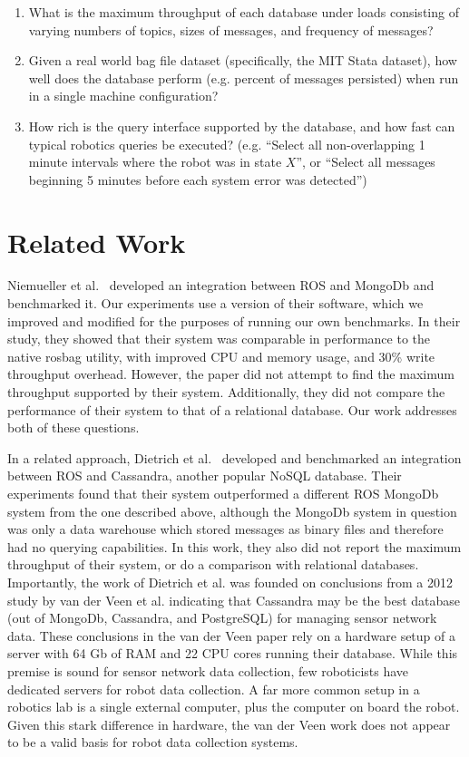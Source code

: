 \documentclass[nocopyrightspace]{acm_proc_article-sp}
\begin{document}
\begin{enumerate}
    \item What is the maximum throughput of each database under loads consisting of varying numbers of topics, sizes of messages, and frequency of messages? 
    \item Given a real world bag file dataset (specifically, the MIT Stata dataset), how well does the database perform (e.g. percent of messages persisted) when run in a single machine configuration?
    \item How rich is the query interface supported by the database, and how fast can typical robotics queries be executed? (e.g. ``Select all non-overlapping 1 minute intervals where the robot was in state $X$'', or ``Select all messages beginning 5 minutes before each system error was detected'')
\end{enumerate}

\section{Related Work}
Niemueller et al.~\cite{niemueller2012generic} developed an integration between ROS and MongoDb and benchmarked it. Our experiments use a version of their software, which we improved and modified for the purposes of running our own benchmarks. In their study, they showed that their system was comparable in performance to the native rosbag utility, with improved CPU and memory usage, and 30\% write throughput overhead. However, the paper did not attempt to find the maximum throughput supported by their system. Additionally, they did not compare the performance of their system to that of a relational database. Our work addresses both of these questions.

In a related approach, Dietrich et al.~\cite{dietrich2014ros} developed and benchmarked an integration between ROS and Cassandra, another popular NoSQL database. Their experiments found that their system outperformed a different ROS MongoDb system from the one described above, although the MongoDb system in question was only a data warehouse which stored messages as binary files and therefore had no querying capabilities. In this work, they also did not report the maximum throughput of their system, or do a comparison with relational databases. Importantly, the work of Dietrich et al. was founded on conclusions from a 2012 study by van der Veen et al. \cite{van2012sensor} indicating that Cassandra may be the best database (out of MongoDb, Cassandra, and PostgreSQL) for managing sensor network data. These conclusions in the van der Veen paper rely on a hardware setup of a server with 64 Gb of RAM and 22 CPU cores running their database. While this premise is sound for sensor network data collection, few roboticists have dedicated servers for robot data collection. A far more common setup in a robotics lab is a single external computer, plus the computer on board the robot. Given this stark difference in hardware, the van der Veen work does not appear to be a valid basis for robot data collection systems.
\end{document}
